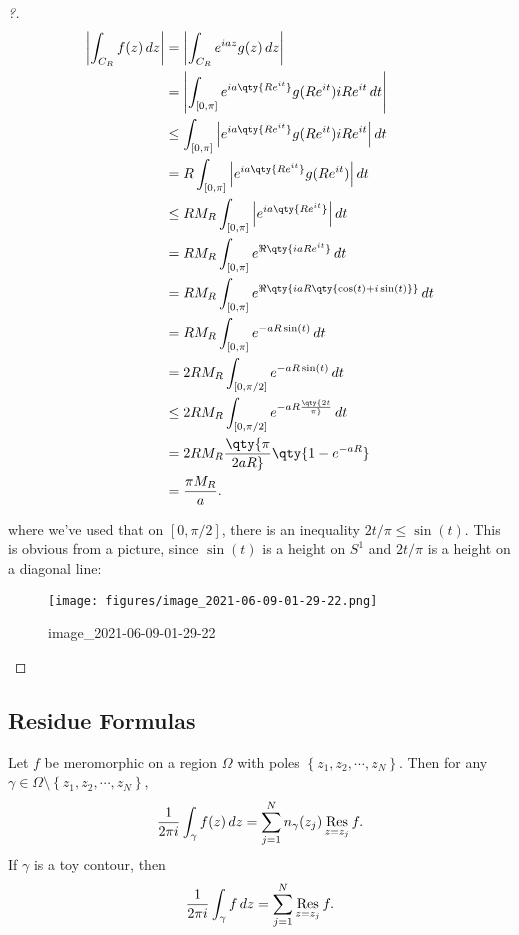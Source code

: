 \begin{proof}[?]

\begin{align*}
{\left\lvert { \int_{C_R} f(z)\,dz} \right\rvert}
&= {\left\lvert { \int_{C_R} e^{iaz}g(z) \,dz} \right\rvert} \\
&= {\left\lvert { \int_{[0, \pi]} e^{ia\qty{Re^{it}}}g(Re^{it}) iRe^{it} \,dt} \right\rvert} \\
&\leq \int_{[0, \pi]} {\left\lvert { e^{ia\qty{Re^{it}}}g(Re^{it}) iRe^{it}} \right\rvert} \,dt\\
&=R \int_{[0, \pi]} {\left\lvert { e^{ia\qty{Re^{it}}}g(Re^{it})} \right\rvert} \,dt\\
&\leq R M_R \int_{[0, \pi]} {\left\lvert { e^{ia\qty{Re^{it}}}} \right\rvert} \,dt\\
&= R M_R \int_{[0, \pi]} e^{\Re\qty{iaRe^{it}}}   \,dt\\
&= R M_R \int_{[0, \pi]} e^{\Re\qty{iaR\qty{\cos(t) + i\sin(t) } }}   \,dt\\
&= R M_R \int_{[0, \pi]} e^{-aR\sin(t) }   \,dt\\
&= 2 R M_R \int_{[0, \pi/2]} e^{-aR\sin(t) }   \,dt\\
&\leq 2R M_R \int_{[0, \pi/2]} e^{-aR\qty{2t\over \pi} }   \,dt\\
&= 2RM_R \qty{\pi \over 2aR}\qty{1-e^{-aR}} \\
&= {\pi M_R \over a}
.\end{align*}

where we've used that on \([0, \pi/2]\), there is an inequality
\(2t/\pi \leq \sin(t)\). This is obvious from a picture, since
\(\sin(t)\) is a height on \(S^1\) and \(2t/\pi\) is a height on a
diagonal line:

\begin{figure}
\centering
\texttt{[image: figures/image\_2021-06-09-01-29-22.png]}
\caption{image\_2021-06-09-01-29-22}
\end{figure}

\end{proof}

\hypertarget{residue-formulas}{%
\subsection{Residue Formulas}\label{residue-formulas}}

\begin{theorem}

Let \(f\) be meromorphic on a region \(\Omega\) with poles
\(\left\{{ { {z}_1, {z}_2, \cdots, {z}_{N}} }\right\}\). Then for any
\(\gamma \in \Omega\setminus\left\{{ { {z}_1, {z}_2, \cdots, {z}_{N}} }\right\}\),
\begin{align*}
{1 \over 2\pi i } \int_\gamma f(z) \,dz= \sum_{j=1}^N n_\gamma(z_j) \mathop{\mathrm{Res}}_{z=z_j} f
.\end{align*}
If \(\gamma\) is a toy contour, then\\
\begin{align*}
{1\over 2\pi i}\int_\gamma f\,dz= \sum_{j=1}^N \mathop{\mathrm{Res}}_{z=z_j}f
.\end{align*}

\end{theorem}

